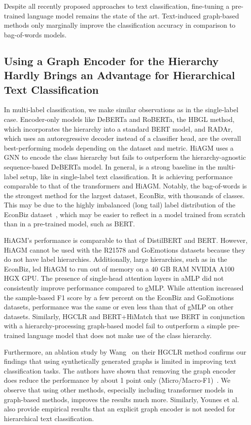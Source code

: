 Despite all recently proposed approaches to text classification, fine-tuning a pre-trained language model remains the state of the art. 
Text-induced graph-based methods only marginally improve the classification accuracy in comparison to bag-of-words models.

\subsection{Using a Graph Encoder for the Hierarchy Hardly Brings an Advantage for Hierarchical Text Classification}
In multi-label classification, we make similar observations as in the single-label case.
Encoder-only models like DeBERTa and RoBERTa, the HBGL method, which incorporates the hierarchy into a standard BERT model, and RADAr, which uses an autoregressive decoder instead of a classifier head, are the overall best-performing models depending on the dataset and metric. 
HiAGM uses a GNN to encode the class hierarchy but fails to outperform the hierarchy-agnostic sequence-based DeBERTa model.
In general, \mlp is a strong baseline in the multi-label setup, like in single-label text classification.
It is achieving performance comparable to that of the transformers and HiAGM.
Notably, the bag-of-words \mlp is the strongest method for the largest dataset, EconBiz, with thousands of classes.
This may be due to the highly imbalanced (long tail) label distribution of the EconBiz dataset~\cite{DBLP:conf/jcdl/MaiGS18}, which may be easier to reflect in a model trained from scratch than in a pre-trained model, such as BERT.

HiAGM's performance is comparable to that of DistilBERT and BERT. However, HiAGM cannot be used with the R21578 and GoEmotions datasets because they do not have label hierarchies. 
Additionally, large hierarchies, such as in the EconBiz, led HiAGM to run out of memory on a 40 GB RAM NVIDIA A100 HGX GPU.
The presence of single-head attention layers in aMLP did not consistently improve performance compared to gMLP. 
While attention increased the sample-based F1 score by a few percent on the EconBiz and GoEmotions datasets, performance was the same or even less than that of gMLP on other datasets.
Similarly, HGCLR and BERT+HiMatch that use BERT in conjunction with a hierarchy-processing graph-based model fail to outperform a simple pre-trained language model that does not make use of the class hierarchy.

Furthermore, an ablation study by
Wang~\etal\cite{DBLP:conf/acl/WangWH0W22} on their HGCLR method confirms our findings
that using synthetically generated graphs is limited in improving text
classification tasks.  The authors have shown that removing the graph encoder
does reduce the performance by about 1 point only
(Micro/Macro-F1)~\cite{DBLP:conf/acl/WangWH0W22}.  We observe that using other methods, especially including transformer models in graph-based methods, improves the results much more. 
Similarly, Younes et al.~\cite{radar} also provide empirical results that an explicit graph encoder is not needed for hierarchical text classification.

